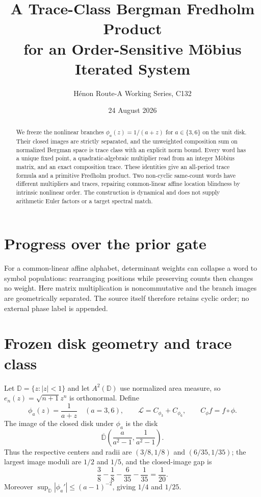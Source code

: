 \documentclass[11pt]{article}
\title{A Trace-Class Bergman Fredholm Product\\
for an Order-Sensitive M\"obius Iterated System}
\author{H\'enon Route-A Working Series, C132}
\date{24 August 2026}
\newcommand{\D}{\mathbb D}
\newcommand{\Lop}{\mathcal L}
\begin{document}
\maketitle

\begin{abstract}
We freeze the nonlinear branches $\phi_a(z)=1/(a+z)$ for $a\in\{3,6\}$
on the unit disk.  Their closed images are strictly separated, and the
unweighted composition sum on normalized Bergman space is trace class with
an explicit norm bound.  Every word has a unique fixed point, a
quadratic-algebraic multiplier read from an integer M\"obius matrix, and an
exact composition trace.  These identities give an all-period trace formula
and a primitive Fredholm product.  Two non-cyclic same-count words have
different multipliers and traces, repairing common-linear affine location
blindness by intrinsic nonlinear order.  The construction is dynamical and
does not supply arithmetic Euler factors or a target spectral match.
\end{abstract}

\section{Progress over the prior gate}

For a common-linear affine alphabet, determinant weights can collapse a word
to symbol populations: rearranging positions while preserving counts then
changes no weight.  Here matrix multiplication is noncommutative and the
branch images are geometrically separated.  The source itself therefore
retains cyclic order; no external phase label is appended.

\section{Frozen disk geometry and trace class}

Let $\D=\{z:|z|<1\}$ and let $A^2(\D)$ use normalized area measure, so
$e_n(z)=\sqrt{n+1}z^n$ is orthonormal.  Define
\[
 \phi_a(z)=\frac1{a+z}\quad(a=3,6),\qquad
 \Lop=C_{\phi_3}+C_{\phi_6},\qquad C_\phi f=f\circ\phi.
\]
The image of the closed disk under $\phi_a$ is the disk
\[
 \overline{\D}\!\left(\frac{a}{a^2-1},\frac1{a^2-1}\right).
\]
Thus the respective centers and radii are $(3/8,1/8)$ and $(6/35,1/35)$;
the largest image moduli are $1/2$ and $1/5$, and the closed-image gap is
\[
 \frac38-\frac18-\frac6{35}-\frac1{35}=\frac1{20}.
\]
Moreover $\sup_{\D}|\phi_a'|\le(a-1)^{-2}$, giving $1/4$ and $1/25$.
\end{document}
